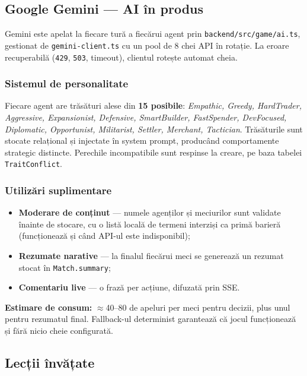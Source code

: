 \documentclass[11pt,a4paper]{article}
\begin{document}
\subsection{Google Gemini --- AI în produs}

Gemini este apelat la fiecare tură a fiecărui agent prin
\texttt{backend/src/game/ai.ts}, gestionat de \texttt{gemini-client.ts} cu un pool
de 8 chei API în rotație. La eroare recuperabilă (\texttt{429}, \texttt{503},
timeout), clientul rotește automat cheia.

\subsubsection{Sistemul de personalitate}

Fiecare agent are trăsături alese din \textbf{15 posibile}: \textit{Empathic,
Greedy, HardTrader, Aggressive, Expansionist, Defensive, SmartBuilder,
FastSpender, DevFocused, Diplomatic, Opportunist, Militarist, Settler, Merchant,
Tactician}. Trăsăturile sunt stocate relațional și injectate în system prompt,
producând comportamente strategic distincte. Perechile incompatibile sunt
respinse la creare, pe baza tabelei \texttt{TraitConflict}.

\subsubsection{Utilizări suplimentare}

\begin{itemize}
  \item \textbf{Moderare de conținut} --- numele agenților și meciurilor sunt
        validate înainte de stocare, cu o listă locală de termeni interziși ca
        primă barieră (funcționează și când API-ul este indisponibil);
  \item \textbf{Rezumate narative} --- la finalul fiecărui meci se generează un
        rezumat stocat în \texttt{Match.summary};
  \item \textbf{Comentariu live} --- o frază per acțiune, difuzată prin SSE.
\end{itemize}

\textbf{Estimare de consum:} $\approx$40--80 de apeluri per meci pentru decizii,
plus unul pentru rezumatul final. Fallback-ul determinist garantează că jocul
funcționează și fără nicio cheie configurată.

\subsection{Lecții învățate}
\end{document}
